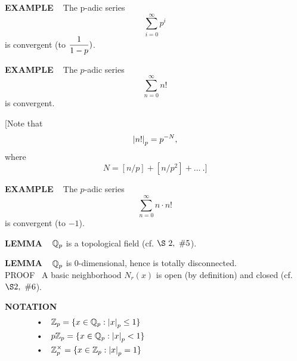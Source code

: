 \vspace{0.1cm}


\begin{x}{\small\bf EXAMPLE} \ %
The p-adic series
\[
\sum_{i=0}^\infty p^i
\]
is convergent (to $\displaystyle\frac{1}{1-p})$.
\end{x}

\vspace{0.1cm}

\begin{x}{\small\bf EXAMPLE} \ %
The $p$-adic series
\[
\sum_{n=0}^\infty n!
\]
is convergent.

\vspace{0.2cm}

[Note that 
\[
\left\vert n!\right\vert_p = p^{-N},
\]
where
\[
N = [n/p] + [n/p^2] + \dots \ .]
\]
\end{x}

\vspace{0.1cm}

\begin{x}{\small\bf EXAMPLE} \ %
The $p$-adic series
\[
\sum_{n=0}^\infty n \cdot n!
\]
is convergent (to $-1$).
\end{x}

\vspace{0.1cm}

\begin{x}{\small\bf LEMMA} \ %
$\mathbb{Q}_p$ is a topological field (cf. $\S\ 2, \  \#5$).
\end{x}

\vspace{0.1cm}


\begin{x}{\small\bf LEMMA} \ %
$\mathbb{Q}_p$ is 0-dimensional, hence is totally disconnected.\\

\indent PROOF \  
A basic neighborhood $N_r(x)$ is open (by definition) and closed (cf. $\S2, \  \#6$).
\end{x}
\vspace{0.1cm}

\begin{x}{\small\bf NOTATION} \ %
\begin{align*} 
&\text{\textbullet} \quad \Z_p = \{x \in \Q_p:\abs{x}_p \le 1\} \qquad\qquad\qquad\qquad\qquad\qquad\qquad\qquad 
\index{$\Z_p$}\\
&\text{\textbullet} \quad p\Z_p = \{x \in \Q_p:\abs{x}_p < 1\} 
\index{$p\Z_p$}\\
&\text{\textbullet} \quad \Z_p^\times = \{x \in \Z_p:\abs{x}_p = 1\} 
\index{$\Z_p^\times$}
\end{align*} 
\end{x}
\vspace{0.1cm}

